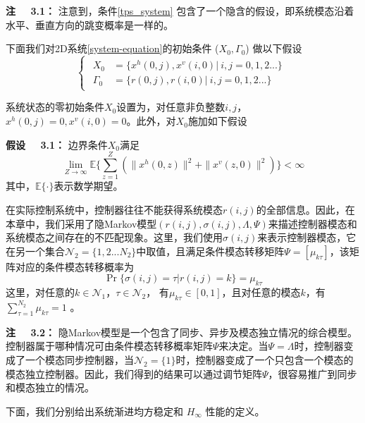 	{\bf 注 \ \ 3.1：}
	注意到，条件\eqref{tps_system} 包含了一个隐含的假设，即系统模态沿着水平、垂直方向的跳变概率是一样的。
	
	下面我们对2D系统\eqref{system-equation}的初始条件 ($X_{0},\varGamma_{0}$) 做以下假设
	\begin{equation} \label{boundary-condition}
	\left\{
	\begin{array}{lr}
	\begin{split}
	X_{0} &= \{x^{h}(0,j),x^{v}(i,0)|\ i,j = 0,1,2...\}\\
	\varGamma_{0} &= \{r(0,j), r(i,0)|\ i,j = 0,1,2... \}
	\end{split}
	\end{array}
	\right.
	\end{equation}
	
	系统状态的零初始条件$X_0$设置为，对任意非负整数$i,j$，$x^{h}(0,j) =0, x^{v}(i,0)=0$。此外，对$X_{0}$施加如下假设
	
	{\bf 假设 \ \ 3.1：}
	边界条件$X_{0}$满足
	\begin{equation}
	\lim\limits_{Z\to\infty}\mathbb{E}\Big\{\sum_{z=1}^{Z}(\|x^{h}(0,z)\|^{2}+ \|x^{v}(z,0)\|^{2})\Big\} < \infty
	\end{equation}
	其中，$\mathbb{E}\{\cdot\}$表示数学期望。
	
	在实际控制系统中，控制器往往不能获得系统模态$r(i,j)$的全部信息。因此，在本章中，我们采用了隐Markov模型$(r(i,j),\sigma(i,j),\varLambda,\varPsi)$来描述控制器模态和系统模态之间存在的不匹配现象。这里，我们使用$\sigma(i,j)$来表示控制器模态，它在另一个集合$\mathcal{N}_{2} = \{1,2...N_{2}\}$中取值，且满足条件模态转移矩阵$\varPsi=[\mu_{k\tau} ]$，该矩阵对应的条件模态转移概率为
	\begin{equation}
	\Pr\{\sigma(i,j)=\tau|r(i,j)=k\}=\mu_{k\tau } %
	\end{equation}
	这里，对任意的$k\in\mathcal{N}_{1}$，$\tau\in\mathcal{N}_{2}$， 有$\mu_{k\tau }\in[0,1]$，且对任意的模态$k$，有 $\sum_{\tau =1}^{N_{2}}\mu_{k\tau } = 1$ 。
	
	{\bf 注 \ \ 3.2：}
	隐Markov模型是一个包含了同步、异步及模态独立情况的综合模型。控制器属于哪种情况可由条件模态转移概率矩阵$\varPsi$来决定。当$\varPsi=\varLambda$时，控制器变成了一个模态同步控制器，当$\mathcal{N}_{2}=\{1\}$时，控制器变成了一个只包含一个模态的模态独立控制器。因此，我们得到的结果可以通过调节矩阵$\varPsi$，很容易推广到同步和模态独立的情况。
	
	下面，我们分别给出系统渐进均方稳定和 $H_{\infty}$ 性能的定义。	
	
